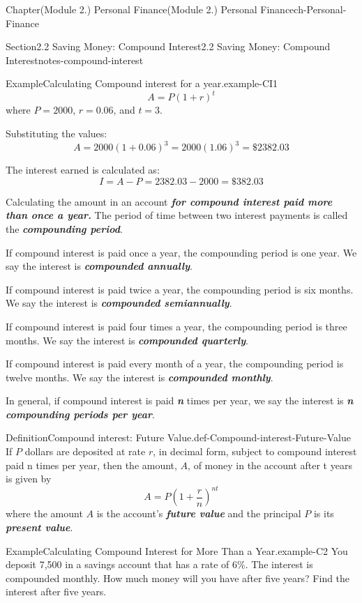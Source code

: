 \documentclass[oneside,10pt,]{book}
\newcommand{\alert}[1]{\textbf{\textit{#1}}}
\begin{document}
\begin{chapterptx}{Chapter}{(Module 2.) Personal Finance}{}{(Module 2.) Personal Finance}{}{}{ch-Personal-Finance}
\begin{sectionptx}{Section}{2.2 Saving Money: Compound Interest}{}{2.2 Saving Money: Compound Interest}{}{}{notes-compound-interest}
\begin{example}{Example}{Calculating Compound interest for a year.}{example-CI1}
\begin{equation*}
A = P(1 + r)^t
\end{equation*}
where \(P = 2000 \), \(r = 0.06 \), and \(t = 3 \).%
\par
Substituting the values:%
\begin{equation*}
A=2000(1+0.06)^3=2000(1.06)^3=\$2382.03
\end{equation*}
%
\par
The interest earned is calculated as:%
\begin{equation*}
I = A - P = 2382.03 - 2000 = \$382.03
\end{equation*}
%
\end{example}
Calculating the amount in an account \alert{for compound interest paid more than once a year.} The period of time between two interest payments is called the \alert{compounding period}.%
\par
If compound interest is paid once a year, the compounding period is one year. We say the interest is \alert{compounded annually}.%
\par
If compound interest is paid twice a year, the compounding period is six months. We say the interest is \alert{compounded semiannually}.%
\par
If compound interest is paid four times a year, the compounding period is three months. We say the interest is \alert{compounded quarterly}.%
\par
If compound interest is paid every month of a year, the compounding period is twelve months. We say the interest is \alert{compounded monthly}.%
\par
In general, if compound interest is paid \alert{n} times per year, we say the interest is \alert{n compounding periods per year}.%
\begin{definition}{Definition}{Compound interest: Future Value.}{def-Compound-interest-Future-Value}%
If \(P\) dollars are deposited at rate \(r\), in decimal form, subject to compound interest paid n times per year, then the amount, \(A\), of money in the account after t years is given by%
%
\begin{equation}
A = P\left(1+\dfrac{r}{n}\right)^{nt}\label{eqn-compound-interest-formula}
\end{equation}
where the amount \(A\) is the account's \alert{future value} and the principal \(P\) is its \alert{present value}.%
\end{definition}
\begin{example}{Example}{Calculating Compound Interest for More Than a Year.}{example-C2}%
You deposit \textdollar{}7,500 in a savings account that has a rate of 6\%. The interest is compounded monthly. How much money will you have after five years? Find the interest after five years.%

\end{example}
\end{sectionptx}
\end{chapterptx}
\end{document}
